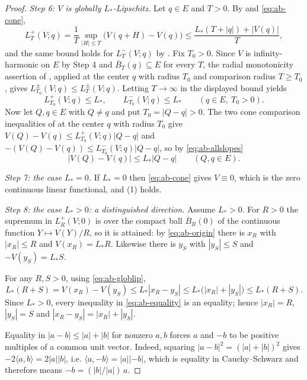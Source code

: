 \begin{proof}
\emph{Step 6: $V$ is globally $L_*$-Lipschitz.}
Let $q\in E$ and $T>0$. By  and \eqref{eq:ab-cone},
\[
  L_T^+(V;q)=\frac1T\sup_{|H|\le T}\bigl(V(q+H)-V(q)\bigr)
   \le\frac{L_*(T+|q|)+|V(q)|}{T},
\]
and the same bound holds for $L_T^-(V;q)$ by . Fix
$T_0>0$. Since $V$ is infinity-harmonic on $E$ by Step 4 and
$\overline B_T(q)\subseteq E$ for every $T$, the radial monotonicity assertion of , applied at the
center $q$ with radius $T_0$ and comparison radius $T\ge T_0$, gives
$L_{T_0}^\pm(V;q)\le L_T^\pm(V;q)$. Letting $T\to\infty$ in the displayed bound
yields
\begin{equation}\label{eq:ab-allslopes}
  L_{T_0}^+(V;q)\le L_*,\qquad L_{T_0}^-(V;q)\le L_*
  \qquad(q\in E,\ T_0>0).
\end{equation}
Now let $Q,q\in E$ with $Q\ne q$ and put $T_0=|Q-q|>0$. The two cone comparison
inequalities of  at the center $q$ with radius $T_0$
give
$V(Q)-V(q)\le L_{T_0}^+(V;q)|Q-q|$ and
$-(V(Q)-V(q))\le L_{T_0}^-(V;q)|Q-q|$, so by \eqref{eq:ab-allslopes}
\begin{equation}\label{eq:ab-globlip}
  |V(Q)-V(q)|\le L_*|Q-q|\qquad(Q,q\in E).
\end{equation}

\emph{Step 7: the case $L_*=0$.}
If $L_*=0$ then \eqref{eq:ab-cone} gives $V\equiv0$, which is the zero
continuous linear functional, and (1) holds.

\emph{Step 8: the case $L_*>0$: a distinguished direction.}
Assume $L_*>0$. For $R>0$ the supremum in $L_R^+(V;0)$ is over the compact ball
$\overline B_R(0)$ of the continuous function $Y\mapsto V(Y)/R$, so it is
attained: by \eqref{eq:ab-origin} there is $x_R$ with $|x_R|\le R$ and
$V(x_R)=L_*R$. Likewise there is $y_S$ with $|y_S|\le S$ and
$-V(y_S)=L_*S$.

For any $R,S>0$, using \eqref{eq:ab-globlip},
\begin{equation}\label{eq:ab-equality}
  L_*(R+S)=V(x_R)-V(y_S)\le L_*|x_R-y_S|\le L_*\bigl(|x_R|+|y_S|\bigr)
   \le L_*(R+S).
\end{equation}
Since $L_*>0$, every inequality in \eqref{eq:ab-equality} is an equality;
hence $|x_R|=R$, $|y_S|=S$ and $|x_R-y_S|=|x_R|+|y_S|$.

Equality in $|a-b|\le|a|+|b|$ for nonzero $a,b$ forces $a$ and $-b$ to be
positive multiples of a common unit vector. Indeed, squaring
$|a-b|^2=(|a|+|b|)^2$ gives $-2\langle a,b\rangle=2|a||b|$, i.e.
$\langle a,-b\rangle=|a||{-b}|$, which is equality in Cauchy--Schwarz and
therefore means $-b=(|b|/|a|)\,a$.


\end{proof}
